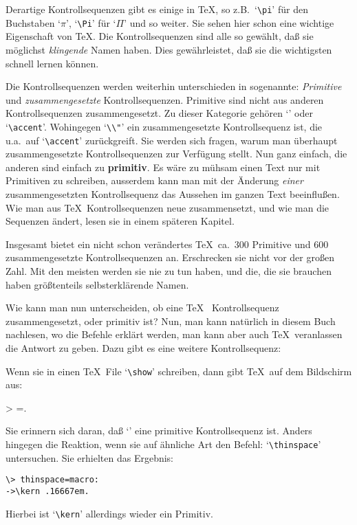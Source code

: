 Derartige 
Kontrollsequenzen gibt es einige in \TeX, so z.B.\ `\verb|\pi|'
f\"ur den Buchstaben `$\pi$', `\verb|\Pi|' f\"ur `$\Pi$' und so weiter.
Sie sehen hier schon eine wichtige Eigenschaft von \TeX. Die
Kontrollsequenzen sind alle so gew\"ahlt, da\ss{} sie m\"oglichst {\em
klingende} Namen haben. Dies gew\"ahrleistet, da\ss{} sie die wichtigsten
schnell lernen k\"onnen.

Die 
Kontrollsequenzen werden weiterhin unterschieden in sogenannte:
{\em Primitive} und {\em zusammengesetzte} 
Kontrollsequenzen.
Primitive sind nicht aus anderen 
Kontrollsequenzen zusammengesetzt. Zu
dieser Kategorie geh\"oren 
`\verb||' oder `\verb|\accent|'.
Wohingegen `\verb|\\"|' ein zusammengesetzte 
Kontrollsequenz ist, die
u.a.\ auf `\verb|\accent|' zur\"uckgreift. Sie werden sich fragen, warum
man \"uberhaupt zusammengesetzte 
Kontrollsequenzen zur Verf\"ugung stellt.
Nun ganz einfach, die anderen sind einfach zu 
{\bf primitiv}. Es w\"are
zu m\"uhsam einen Text nur mit Primitiven zu schreiben, ausserdem kann
man mit der \"Anderung {\em einer} zusammengesetzten
Kontrollsequenz das
Aussehen im ganzen Text beeinflu\ss{}en. Wie man aus \TeX\
Kontrollsequenzen neue zusammensetzt, und wie man die Sequenzen
\"andert, lesen sie in einem sp\"ateren Kapitel.

Insgesamt bietet ein nicht schon ver\"andertes \TeX\ ca.\ 300
Primitive
und 600 zu\-sam\-men\-ge\-setz\-te 
Kontrollsequenzen an. Erschrecken sie nicht
vor der gro\ss{}en Zahl. Mit den meisten werden sie nie zu tun haben, und
die, die sie brauchen haben gr\"o\ss{}tenteils selbsterkl\"arende Namen.

Wie kann man nun unterscheiden, ob eine \TeX\ 
Kontrollsequenz
zusammengesetzt, oder 
primitiv ist? Nun, man kann nat\"urlich in diesem
Buch nachlesen, wo die Befehle erkl\"art werden, man kann aber auch
\TeX\ veranlassen die Antwort zu geben. Dazu gibt es eine weitere
Kontrollsequenz:
\begin{verbatim*}
\show
\end{verbatim*}
Wenn sie in einen \TeX\ File 
`\verb|\show|' schreiben, dann gibt
\TeX\ auf dem Bildschirm aus:
\begin{verbatim*}
> =.
\end{verbatim*}
Sie erinnern sich daran, da\ss{} `\verb||' eine primitive
\index{Kontrollsequenz}
Kontrollsequenz ist. Anders hingegen die Reaktion, wenn sie auf
\"ahnliche Art den Befehl: 
`\verb|\thinspace|' untersuchen. Sie
erhielten das Ergebnis:
\begin{verbatim}
\> thinspace=macro:
->\kern .16667em.
\end{verbatim}
Hierbei ist `\verb|\kern|' allerdings wieder ein Primitiv.

